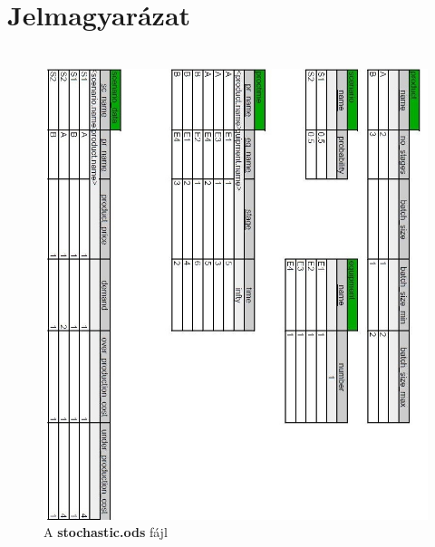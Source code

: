 \appendix
\chapter{Jelmagyarázat}
\chapter{} \label{input_files}
\begin{figure}[H]
\begin{center}
\includegraphics[scale=0.60]{stochasticOds}
\caption{A \textbf{stochastic.ods} fájl}
\label{stochastic_ods}
\end{center}
\end{figure}
